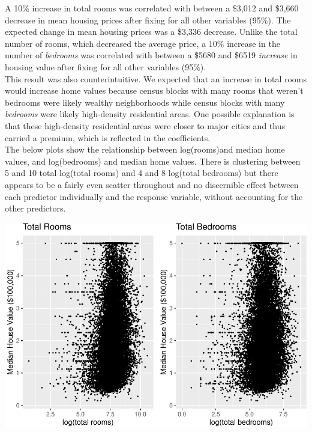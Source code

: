 \documentclass{article}
\begin{document}
A 10\% increase in total rooms was correlated with between a \$3,012 and \$3,660 decrease in mean housing prices after fixing for all other variables (95\%). The expected change in mean housing prices was a \$3,336 decrease. Unlike the total number of rooms, which decreased the average price, a 10\% increase in the number of \emph{bedrooms} was correlated with between a \$5680 and \$6519 \emph{increase} in housing value after fixing for all other variables (95\%). \\

This result was also counterintuitive. We expected that an increase in total rooms would increase home values because census blocks with many rooms that weren't bedrooms were likely wealthy neighborhoods while census blocks with many \emph{bedrooms} were likely high-density residential areas. One possible explanation is that these high-density residential areas were closer to major cities and thus carried a premium, which is reflected in the coefficients. \\

The below plots show the relationship between log(rooms)and median home values, and log(bedrooms) and median home values. There is clustering between 5 and 10 total log(total rooms) and 4 and 8 log(total bedrooms) but there appears to be a fairly even scatter throughout and no discernible effect between each predictor individually and the response variable, without accounting for the other predictors.

\hfill

\begin{center}
    \includegraphics[scale = 0.9]{Total Rooms + Total Bedrooms.pdf}
\end{center}
\end{document}
